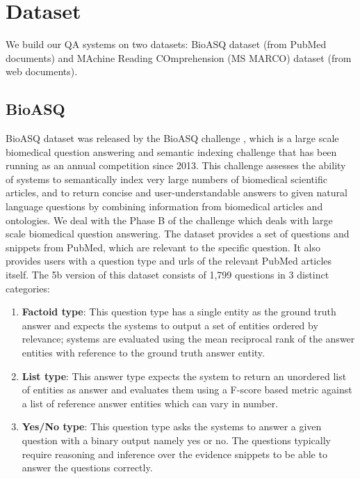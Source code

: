 
\section{Dataset}

We build our QA systems on two datasets: BioASQ dataset (from PubMed documents) and MAchine Reading COmprehension (MS MARCO) dataset (from web documents).

\subsection{BioASQ}
\label{Dataset}

BioASQ dataset was released by the BioASQ challenge \cite{bioasq}, which is a large scale biomedical question answering and semantic indexing challenge that has been running as an annual competition since 2013. This challenge assesses the ability of systems to semantically index very large numbers of biomedical scientific articles, and to return concise and user-understandable answers to given natural language questions by combining information from biomedical articles and ontologies.
We deal with the Phase B of the challenge which deals with large scale biomedical question answering. The dataset provides a set of questions and snippets from PubMed, which are relevant to the specific question. It also provides users with a question type and urls of the relevant PubMed articles itself. The 5b version of this dataset consists of 1,799 questions in 3 distinct categories:

\begin{enumerate}
    \item \textbf{Factoid type}: This question type has a single entity as the ground truth answer and expects the systems to output a set of  entities ordered by relevance; systems are evaluated using the mean reciprocal rank \cite{MRR} of the answer entities with reference to the ground truth answer entity.
    \item \textbf{List type}: This answer type expects the system to return an unordered list of entities as answer and evaluates them using a F-score based metric against a list of reference answer entities which can vary in number.
    \item \textbf{Yes/No type}: This question type asks the systems to answer a given question with a binary output namely yes or no. The questions typically require reasoning and inference over the evidence snippets to be able to answer the questions correctly.
\end{enumerate}

